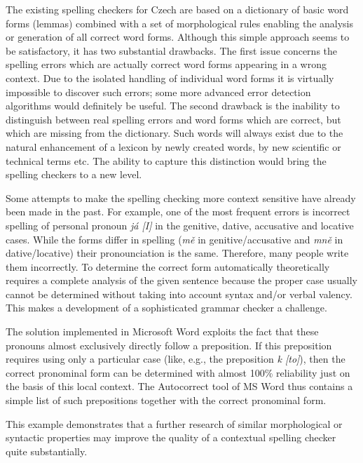 \documentclass[]{../../metanetpaper}
\begin{document}
\begin{multicols}{2}
The existing spelling checkers for Czech are based on a dictionary of basic word forms (lemmas) combined with a set of morphological rules enabling the analysis or generation of all correct word forms. Although this simple approach seems to be satisfactory, it has two substantial drawbacks. The first issue concerns the spelling errors which are actually correct word forms appearing in a wrong context. Due to the isolated handling of individual word forms it is virtually impossible to discover such errors; some more advanced error detection algorithms would definitely be useful. The second drawback is the inability to distinguish between real spelling errors and word forms which are correct, but which are missing from the dictionary. Such words will always exist due to the natural enhancement of a lexicon by newly created words, by new scientific or technical terms etc. The ability to capture this distinction would bring the spelling checkers to a new level.

Some attempts to make the spelling checking more context sensitive have already been made in the past. For example, one of the most frequent errors is incorrect spelling of personal pronoun \textit{já {[}I{]}} in the genitive, dative, accusative and locative cases. While the forms differ in spelling (\textit{mě} in genitive/accusative and \textit{mně} in dative/locative) their pronounciation is the same. Therefore,  many people write them incorrectly. To determine the correct form automatically theoretically requires a complete analysis of the given sentence because the proper case usually cannot be determined without taking into account syntax and/or verbal valency. This makes a development of a sophisticated grammar checker a challenge.

The solution implemented in Microsoft Word exploits the fact that these pronouns almost exclusively directly follow a preposition. If this preposition requires using only a particular case (like, e.g., the preposition \textit{k {[}to{]}}), then the correct pronominal form can be determined with almost 100\% reliability just on the basis of this local context. The Autocorrect tool of MS Word thus contains a simple list of such prepositions together with the correct pronominal form.

This example demonstrates that a further research of similar morphological or syntactic properties may improve the quality of a contextual spelling checker quite substantially.


\end{multicols}
\end{document}

